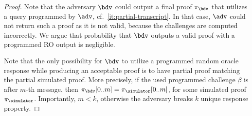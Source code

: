 \documentclass[runningheads,11pt]{llncs}
\begin{document}
\begin{proof}
   Note that the adversary $\bdv$ could output a final proof $\zkproofb$ that utilizes a query programmed by $\adv$, cf.~\cref{it:partial-transcript}. In that case, $\adv$ could not return such a proof as it is not valid, because the challenges are computed incorrectly. We argue that probability that $\bdv$ outputs a valid proof with a programmed RO output is negligible.

  Note that the only possibility for $\bdv$ to utilize a programmed random oracle response while producing an acceptable proof is to have partial proof matching the partial simulated proof. More precisely, if the used programmed challenge $\beta$ is after $m$-th message, then $\zkproofb[0..m] = \zkproofs[0..m]$, for some simulated proof $\zkproofs$. Importantly, $m < k$, otherwise the adversary breaks $k$ unique response property.


\end{proof}
\end{document}
